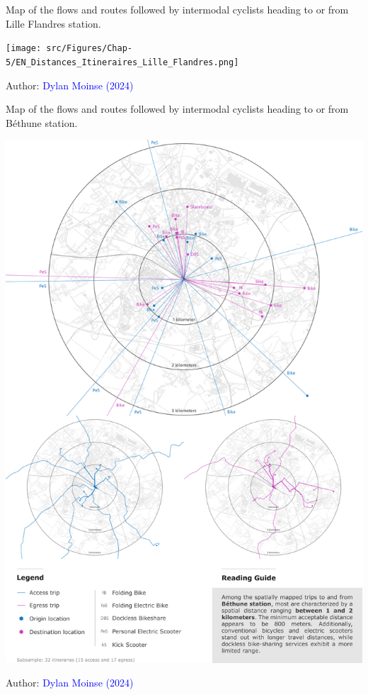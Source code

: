 \begin{refsegment}
\begin{carte}[h!]\vspace*{4pt}
    \caption{Map of the flows and routes followed by intermodal cyclists heading to or from Lille Flandres station.}
    \label{fig-chap5:itineraires-lille-flandres}
    \centerline{\texttt{[image: src/Figures/Chap-5/EN\_Distances\_Itineraires\_Lille\_Flandres.png]}}
    \vspace{5pt}
    \begin{flushright}\scriptsize{
    Author: \textcolor{blue}{Dylan Moinse (2024)}
    }\end{flushright}
\end{carte}

\begin{carte}[h!]\vspace*{4pt}
    \caption{Map of the flows and routes followed by intermodal cyclists heading to or from Béthune station.}
    \label{fig-chap5:itineraires-bethune}
    \centerline{\includegraphics[width=1\columnwidth]{src/Figures/Chap-5/EN_Distances_Itineraires_Bethune.png}}
    \vspace{5pt}
    \begin{flushright}\scriptsize{
    Author: \textcolor{blue}{Dylan Moinse (2024)}
    }\end{flushright}
\end{carte}


\end{refsegment}
